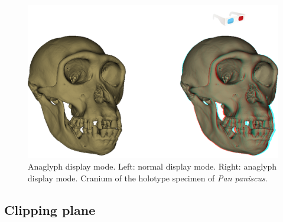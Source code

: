 \begin{figure}
  \centering
  \includegraphics[scale=0.34]{images/06/display/anaglyph_example.png} 
	\caption{Anaglyph display mode. Left: normal display mode. Right: anaglyph display mode. Cranium of the holotype specimen of \textit{Pan paniscus}.}
\label{anaglyph_example}
 
\end{figure}




\subsection{Clipping plane} \label{Clipping_plane}

